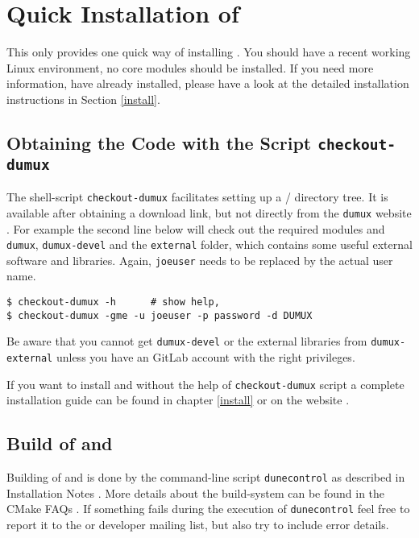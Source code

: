 \section{Quick Installation of \Dumux}
\label{quick-install}

This only provides one quick way of installing \Dumux.
You should have a recent working Linux environment, no \Dune core modules should be installed.
If you need more information,
have \Dune already installed, please have a look at the detailed installation
instructions in Section \ref{install}.

\subsection{Obtaining the Code with the Script \texttt{checkout-dumux}}

The shell-script \texttt{checkout-dumux}
facilitates setting up a {\Dune}/{\Dumux} directory tree.
It is available after obtaining a download link, but not directly from the \texttt{dumux} website \cite{DUMUX-DOWNLOAD}.
For example the second line below will check out the required \Dune modules and \texttt{dumux},
\texttt{dumux-devel} and the \texttt{external} folder, which contains some useful external software and libraries.
Again,  \texttt{joeuser} needs to be replaced by the actual user name.
\begin{lstlisting}[style=Bash]
$ checkout-dumux -h      # show help,
$ checkout-dumux -gme -u joeuser -p password -d DUMUX
\end{lstlisting}

Be aware that you cannot get \texttt{dumux-devel} or the external libraries from \texttt{dumux-external} unless
you have an GitLab account with the right privileges.

If you want to install \Dune and \Dumux without the help of \texttt{checkout-dumux} script a complete installation
guide can be found in chapter \ref{install} or on the \Dune website \cite{DUNE-INST}.

\subsection{Build of \Dune and \Dumux}
\label{buildIt}
Building of \Dune and \Dumux is done by the command-line script \texttt{dunecontrol} as described in \Dune Installation Notes \cite{DUNE-INST}.
More details about the build-system can be found in the \Dune CMake FAQs \cite{DUNE-CMAKE}.
If something fails during the execution of \texttt{dunecontrol} feel free to report it to the \Dune or \Dumux developer mailing list,
but also try to include error details.


